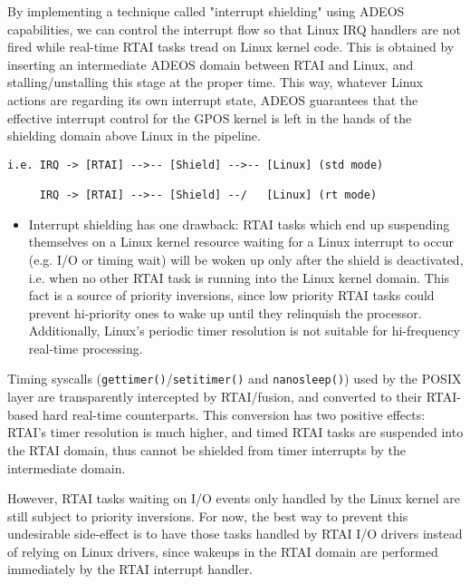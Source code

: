 By implementing a technique called "interrupt shielding"
using ADEOS capabilities, we can control the interrupt flow
so that Linux IRQ handlers are not fired while real-time
RTAI tasks tread on Linux kernel code. This is obtained by
inserting an intermediate ADEOS domain between RTAI and Linux,
and stalling/unstalling this stage at the proper time. This
way, whatever Linux actions are regarding its own interrupt
state, ADEOS guarantees that the effective interrupt control
for the GPOS kernel is left in the hands of the shielding
domain above Linux in the pipeline.

\begin{verbatim}
i.e. IRQ -> [RTAI] -->-- [Shield] -->-- [Linux] (std mode)

     IRQ -> [RTAI] -->-- [Shield] --/   [Linux] (rt mode)
\end{verbatim}

\begin{itemize}

\item Interrupt shielding has one drawback: RTAI tasks which end up
suspending themselves on a Linux kernel resource waiting for a Linux
interrupt to occur (e.g. I/O or timing wait) will be woken up only
after the shield is deactivated, i.e. when no other RTAI task is
running into the Linux kernel domain. This fact is a source of
priority inversions, since low priority RTAI tasks could prevent
hi-priority ones to wake up until they relinquish the processor.
Additionally, Linux's periodic timer resolution is not suitable for
hi-frequency real-time processing.

\end{itemize}

Timing syscalls (\texttt{gettimer()}/\texttt{setitimer()} and \texttt{nanosleep()}) used by
the POSIX layer are transparently intercepted by RTAI/fusion,
and converted to their RTAI-based hard real-time
counterparts. This conversion has two positive effects: RTAI's
timer resolution is much higher, and timed RTAI tasks
are suspended into the RTAI domain, thus cannot be shielded
from timer interrupts by the intermediate domain.

However, RTAI tasks waiting on I/O events only handled by the
Linux kernel are still subject to priority inversions. For
now, the best way to prevent this undesirable side-effect is
to have those tasks handled by RTAI I/O drivers instead of
relying on Linux drivers, since wakeups in the RTAI domain
are performed immediately by the RTAI interrupt handler.

